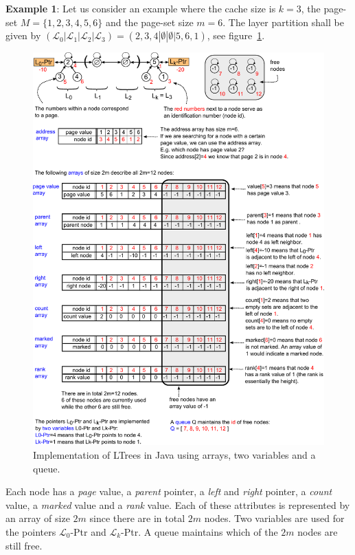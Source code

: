 \documentclass[a4paper,12pt, titlepage]{article}  %
\newcommand{\cl}{\mathcal{L}}   %
\begin{document}
\noindent \textbf{Example 1}: Let us consider an example where the cache size is $k=3$, the page-set $M=\{1,2,3,4,5,6\}$ and
the page-set size $m=6$. The layer partition shall be given by 
$( \cl_0 | \cl_1 | \cl_2 | \cl_3) = (2,3,4 | \emptyset | \emptyset | 5,6,1)$, see figure~\ref{fig:java_implementation1}.

\begin{figure}[htp]
	\centering
	\includegraphics[scale=0.95]{./figures/java_implementation1.pdf}
	\caption{Implementation of LTrees in Java using arrays, two variables and a queue.} 
	\label{fig:java_implementation1}
\end{figure}

\noindent Each node has a \emph{page} value, a \emph{parent} pointer, a \emph{left} and \emph{right} pointer, a \emph{count} value, 
a \emph{marked} value and a \emph{rank} value. 
Each of these attributes is represented by an array of size $2m$ since there are in total $2m$ nodes. 
Two variables are used for the pointers $\cl_0$-Ptr and $\cl_k$-Ptr. A queue maintains which of the $2m$ nodes are still free.
\end{document}
